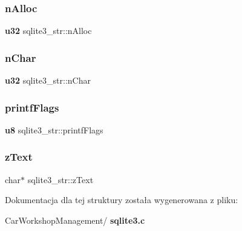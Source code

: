 \mbox{\label{structsqlite3__str_a158761c3345c53b544eb399c4dab6fc6}} 
\subsubsection{nAlloc}
{\footnotesize\ttfamily \textbf{ u32} sqlite3\+\_\+str\+::n\+Alloc}

\mbox{\label{structsqlite3__str_a2357d3782b6786efbfeb763b59cc4b23}} 
\subsubsection{nChar}
{\footnotesize\ttfamily \textbf{ u32} sqlite3\+\_\+str\+::n\+Char}

\mbox{\label{structsqlite3__str_a0fefb583561d582f677a0d4424ee9265}} 
\subsubsection{printfFlags}
{\footnotesize\ttfamily \textbf{ u8} sqlite3\+\_\+str\+::printf\+Flags}

\mbox{\label{structsqlite3__str_ab818abda9d4c9ab038e32e416290adb1}} 
\subsubsection{zText}
{\footnotesize\ttfamily char$\ast$ sqlite3\+\_\+str\+::z\+Text}



Dokumentacja dla tej struktury została wygenerowana z pliku\+:\begin{DoxyCompactItemize}
\item 
Car\+Workshop\+Management/\textbf{ sqlite3.\+c}\end{DoxyCompactItemize}
